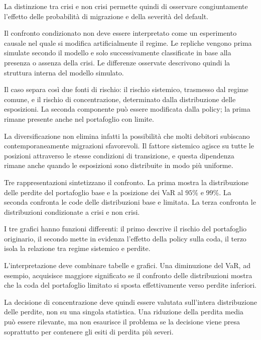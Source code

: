 La distinzione tra crisi e non crisi permette quindi di osservare
congiuntamente l'effetto delle probabilit\`a di migrazione e della severit\`a
del default.

Il confronto condizionato non deve essere interpretato come un esperimento
causale nel quale si modifica artificialmente il regime. Le repliche vengono
prima simulate secondo il modello e solo successivamente classificate in base
alla presenza o assenza della crisi. Le differenze osservate descrivono quindi
la struttura interna del modello simulato.

Il caso separa cos\`i due fonti di rischio: il rischio sistemico, trasmesso
dal regime comune, e il rischio di concentrazione, determinato dalla
distribuzione delle esposizioni. La seconda componente pu\`o essere modificata
dalla policy; la prima rimane presente anche nel portafoglio con limite.

La diversificazione non elimina infatti la possibilit\`a che molti debitori
subiscano contemporaneamente migrazioni sfavorevoli. Il fattore sistemico
agisce su tutte le posizioni attraverso le stesse condizioni di transizione,
e questa dipendenza rimane anche quando le esposizioni sono distribuite in
modo pi\`u uniforme.

Tre rappresentazioni sintetizzano il confronto. La prima mostra la
distribuzione delle perdite del portafoglio base e la posizione dei VaR al
$95\%$ e $99\%$. La seconda confronta le code delle distribuzioni base e
limitata. La terza confronta le distribuzioni condizionate a crisi e non
crisi.

I tre grafici hanno funzioni differenti: il primo descrive il rischio del
portafoglio originario, il secondo mette in evidenza l'effetto della policy
sulla coda, il terzo isola la relazione tra regime sistemico e perdite.

L'interpretazione deve combinare tabelle e grafici. Una diminuzione del VaR,
ad esempio, acquisisce maggiore significato se il confronto delle
distribuzioni mostra che la coda del portafoglio limitato si sposta
effettivamente verso perdite inferiori.

La decisione di concentrazione deve quindi essere valutata sull'intera
distribuzione delle perdite, non su una singola statistica. Una riduzione
della perdita media pu\`o essere rilevante, ma non esaurisce il problema se
la decisione viene presa soprattutto per contenere gli esiti di perdita
pi\`u severi.
%


